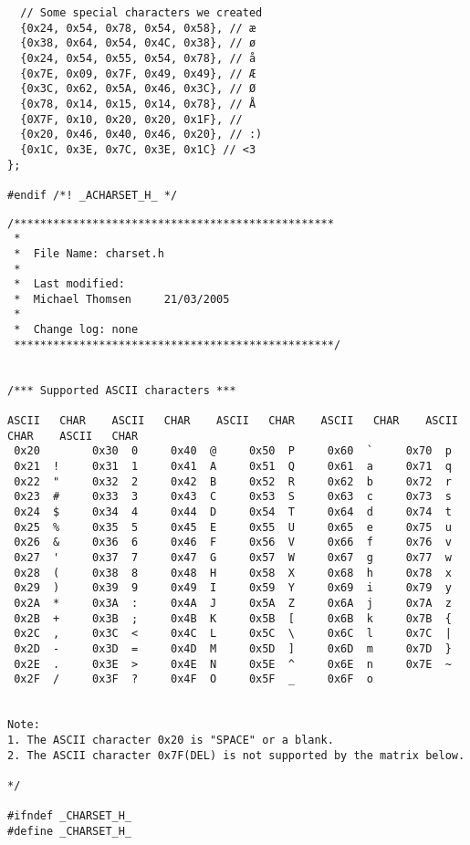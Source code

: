 \begin{lstlisting}
  // Some special characters we created
  {0x24, 0x54, 0x78, 0x54, 0x58}, // æ
  {0x38, 0x64, 0x54, 0x4C, 0x38}, // ø
  {0x24, 0x54, 0x55, 0x54, 0x78}, // å
  {0x7E, 0x09, 0x7F, 0x49, 0x49}, // Æ
  {0x3C, 0x62, 0x5A, 0x46, 0x3C}, // Ø
  {0x78, 0x14, 0x15, 0x14, 0x78}, // Å
  {0X7F, 0x10, 0x20, 0x20, 0x1F}, // 
  {0x20, 0x46, 0x40, 0x46, 0x20}, // :)
  {0x1C, 0x3E, 0x7C, 0x3E, 0x1C} // <3
};

#endif /*! _ACHARSET_H_ */
\end{lstlisting}

\begin{lstlisting}
/*************************************************
 *
 *  File Name: charset.h
 *
 *  Last modified:
 *  Michael Thomsen     21/03/2005
 *
 * 	Change log: none
 *************************************************/


/*** Supported ASCII characters ***

ASCII	CHAR	ASCII	CHAR	ASCII	CHAR	ASCII	CHAR	ASCII	CHAR	ASCII	CHAR
 0x20        0x30  0     0x40  @     0x50  P     0x60  `     0x70  p		
 0x21  !     0x31  1     0x41  A     0x51  Q     0x61  a     0x71  q		
 0x22  "     0x32  2     0x42  B     0x52  R     0x62  b     0x72  r
 0x23  #     0x33  3     0x43  C     0x53  S     0x63  c     0x73  s
 0x24  $     0x34  4     0x44  D     0x54  T     0x64  d     0x74  t
 0x25  %     0x35  5     0x45  E     0x55  U     0x65  e     0x75  u
 0x26  &     0x36  6     0x46  F     0x56  V     0x66  f     0x76  v
 0x27  '     0x37  7     0x47  G     0x57  W     0x67  g     0x77  w		
 0x28  (     0x38  8     0x48  H     0x58  X     0x68  h     0x78  x	
 0x29  )     0x39  9     0x49  I     0x59  Y     0x69  i     0x79  y
 0x2A  *     0x3A  :     0x4A  J     0x5A  Z     0x6A  j     0x7A  z
 0x2B  +     0x3B  ;     0x4B  K     0x5B  [     0x6B  k     0x7B  {
 0x2C  ,     0x3C  <     0x4C  L     0x5C  \     0x6C  l     0x7C  |
 0x2D  -     0x3D  =     0x4D  M     0x5D  ]     0x6D  m     0x7D  }
 0x2E  .     0x3E  >     0x4E  N     0x5E  ^     0x6E  n     0x7E  ~
 0x2F  /     0x3F  ?     0x4F  O     0x5F  _     0x6F  o
 

Note: 
1. The ASCII character 0x20 is "SPACE" or a blank.
2. The ASCII character 0x7F(DEL) is not supported by the matrix below.

*/

#ifndef _CHARSET_H_
#define _CHARSET_H_


\end{lstlisting}
